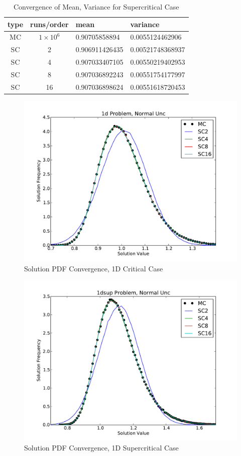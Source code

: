 \begin{table}
\begin{center}
\begin{tabular}{c c|l l}
type & runs/order & mean & variance \\ \hline
MC & $1\times10^6$ & 0.90705858894 &0.0055124462906   \\
SC & 2 & 0.906911426435 & 0.00521748368937  \\
SC & 4 & 0.907033407105 & 0.00550219402953 \\
SC & 8 & 0.907036892243 & 0.00551754177997  \\
SC & 16 & 0.907036898624 & 0.00551618720453
\end{tabular}
\end{center}
\caption{Convergence of Mean, Variance for Supercritical Case}
\label{tab:1dsub}
\end{table}

\begin{figure}[h!]
\centering
   \includegraphics[width=.5\textwidth]{../graphics/1d_normal_pdfs}
   \caption{Solution PDF Convergence, 1D Critical Case}
   \label{fig:1dcrit}
\end{figure}

\begin{figure}[h!]
\centering
   \includegraphics[width=.5\textwidth]{../graphics/1dsup_normal_pdfs}
   \caption{Solution PDF Convergence, 1D Supercritical Case}
      \label{fig:1dsup}
\end{figure}

